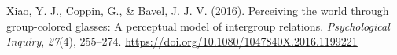 \documentclass[
  man]{apa6}
\newlength{\cslhangindent}
\newlength{\cslentryspacingunit} %
\newenvironment{CSLReferences}[2] %
 {%
  \setlength{\parindent}{0pt}
  \ifodd #1
  \let\oldpar\par
  \def\par{\hangindent=\cslhangindent\oldpar}
  \fi
  \setlength{\parskip}{#2\cslentryspacingunit}
 }%
 {}
\begin{document}
\begin{CSLReferences}{1}{0}
\leavevmode{}%
Xiao, Y. J., Coppin, G., \& Bavel, J. J. V. (2016). Perceiving the world through group-colored glasses: A perceptual model of intergroup relations. \emph{Psychological Inquiry}, \emph{27}(4), 255--274. \url{https://doi.org/10.1080/1047840X.2016.1199221}

\end{CSLReferences}

\endgroup
\end{document}
